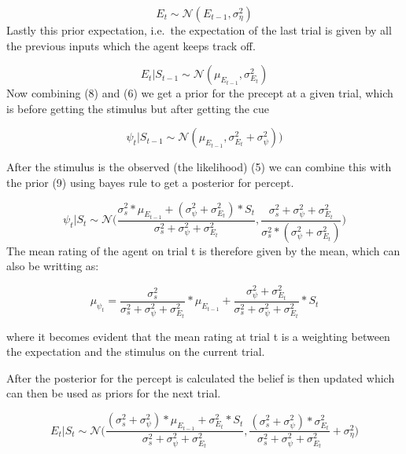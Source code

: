 \documentclass[
]{article}
\begin{document}
\[
\begin{equation}
\tag{7}
E_t \sim \mathcal{N}{(E_{t-1}, \sigma_\eta^2)}
\end{equation}
\] Lastly this prior expectation, i.e.~the expectation of the last trial
is given by all the previous inputs which the agent keeps track off.

\[
\begin{equation}
\tag{8}
E_t | S_{{t-1}} \sim \mathcal{N}{(\mu_{E_{t-1}}, \sigma_{E_t}^2)}
\end{equation}
\] Now combining (8) and (6) we get a prior for the precept at a given
trial, which is before getting the stimulus but after getting the cue

\[
\begin{equation}
\tag{9}
\psi_t | S_{{t-1}} \sim \mathcal{N}{(\mu_{E_{t-1}}, \sigma_{E_t}^2+ \sigma_{\psi}^2))}
\end{equation}
\]

After the stimulus is the observed (the likelihood) (5) we can combine
this with the prior (9) using bayes rule to get a posterior for percept.

\[
\begin{equation}
\tag{10}
\psi_t | S_{{t}} \sim \mathcal{N}{(\frac{\sigma_{s}^2*\mu_{E_{t-1}}+(\sigma_{\psi}^2+\sigma_{E_t}^2)*S_t}{\sigma_{s}^2+\sigma_{\psi}^2+\sigma_{E_t}^2}, \frac{\sigma_{s}^2+\sigma_{\psi}^2+\sigma_{E_t}^2}{\sigma_{s}^2*(\sigma_{\psi}^2+\sigma_{E_t}^2)}})
\end{equation}
\] The mean rating of the agent on trial t is therefore given by the
mean, which can also be writting as:

\[
\begin{equation}
\tag{11}
\mu_{\psi_t} = \frac{\sigma_{s}^2}{\sigma_{s}^2+\sigma_{\psi}^2+\sigma_{E_t}^2}*\mu_{E_{t-1}}+\frac{\sigma_{\psi}^2+\sigma_{E_t}^2}{\sigma_{s}^2+\sigma_{\psi}^2+\sigma_{E_t}^2}*S_t
\end{equation}
\]

where it becomes evident that the mean rating at trial t is a weighting
between the expectation and the stimulus on the current trial.

After the posterior for the percept is calculated the belief is then
updated which can then be used as priors for the next trial.

\[
\begin{equation}
\tag{12}
E_{t}|S_t \sim \mathcal{N}{(\frac{(\sigma_{s}^2+\sigma_{\psi}^2)*\mu_{E_{t-1}}+\sigma_{E_t}^2*S_t}{\sigma_{s}^2+\sigma_{\psi}^2+\sigma_{E_t}^2}, \frac{(\sigma_{s}^2+\sigma_{\psi}^2)*\sigma_{E_t}^2}{\sigma_{s}^2+\sigma_{\psi}^2+\sigma_{E_t}^2}+\sigma_\eta^2})
\end{equation}
\]
\end{document}
